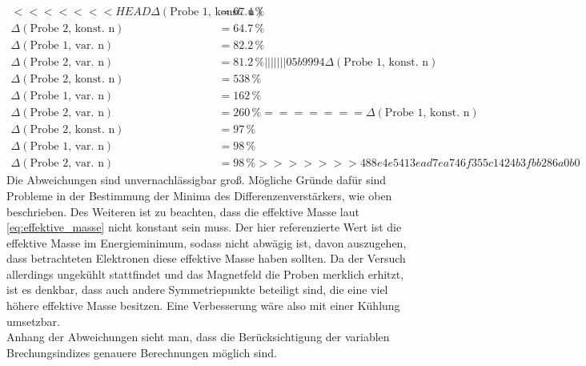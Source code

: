 \begin{align*}
<<<<<<< HEAD
    \Delta(\text{Probe 1, konst. n}) &= 67.4 \, \% \\
    \Delta(\text{Probe 2, konst. n}) &= 64.7 \, \% \\
    \Delta(\text{Probe 1, var. n})   &= 82.2 \, \% \\
    \Delta(\text{Probe 2, var. n})   &= 81.2 \, \% 
||||||| 05b9994
    \Delta(\text{Probe 1, konst. n}) &= 375 \, \% \\
    \Delta(\text{Probe 2, konst. n}) &= 538 \, \% \\
    \Delta(\text{Probe 1, var. n})   &= 162 \, \% \\
    \Delta(\text{Probe 2, var. n})   &= 260 \, \% 
=======
    \Delta(\text{Probe 1, konst. n}) &= 97 \, \% \\
    \Delta(\text{Probe 2, konst. n}) &= 97 \, \% \\
    \Delta(\text{Probe 1, var. n})   &= 98 \, \% \\
    \Delta(\text{Probe 2, var. n})   &= 98 \, \% 
>>>>>>> 488e4e5413ead7ea746f355c1424b3fbb286a0b0
\end{align*}
Die Abweichungen sind unvernachlässigbar groß. Mögliche Gründe dafür sind Probleme in der Bestimmung der Minima des Differenzenverstärkers, wie oben beschrieben.
Des Weiteren ist zu beachten, dass die effektive Masse laut \autoref{eq:effektive_masse} nicht konstant sein muss. Der hier referenzierte Wert
ist die effektive Masse im Energieminimum, sodass nicht abwägig ist, davon auszugehen, dass betrachteten Elektronen diese effektive Masse haben sollten. Da der Versuch allerdings ungekühlt stattfindet und das Magnetfeld
die Proben merklich erhitzt, ist es denkbar, dass auch andere Symmetriepunkte beteiligt sind, die eine viel höhere effektive Masse besitzen. Eine Verbesserung wäre also mit einer Kühlung umsetzbar.\\
Anhang der Abweichungen sieht man, dass die Berücksichtigung der variablen Brechungsindizes genauere Berechnungen möglich sind.

